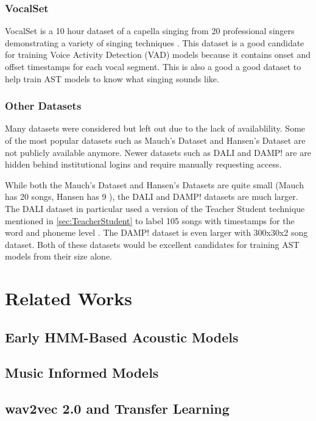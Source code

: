 \documentclass[12pt]{article}
\begin{document}
\begin{multicols*}{2}
\subsubsection{VocalSet}
VocalSet is a 10 hour dataset of a capella singing from 20 professional singers
demonstrating a variety of singing techniques \cite{VocalSet}. This dataset is a good candidate for
training Voice Activity Detection (VAD) models because it contains onset and offset timestamps for
each vocal segment. This is also a good a good dataset to help train AST models to know what singing
sounds like.

\subsubsection{Other Datasets}
Many datasets were considered but left out due to the lack of availablility. Some of the most
popular datasets such as Mauch's Dataset \cite{mirex2021} and Hansen's Dataset \cite{Hansen} are
not publicly available anymore. Newer datasets such as DALI \cite{DALI} and DAMP! \cite{DAMP} are
are hidden behind institutional logins and require manually requesting access.

While both the Mauch's Dataset and Hansen's Datasets are quite small (Mauch has 20 songs, Hansen has 9 \cite{mirex2021}), the
DALI and DAMP! datasets are much larger. The DALI dataset in particular used a version of the
Teacher Student technique mentioned in \ref{sec:TeacherStudent} to label 105 songs with timestamps
for the word and phoneme level \cite{DALI}. The DAMP! dataset is even larger with 300x30x2 song
dataset. Both of these datasets would be excellent candidates for training AST models from their
size alone.

\section{Related Works}
\subsection{Early HMM-Based Acoustic Models}

\subsection{Music Informed Models}
\subsection{wav2vec 2.0 and Transfer Learning} \label{sec:wav2vec}

\end{multicols*}
\end{document}
